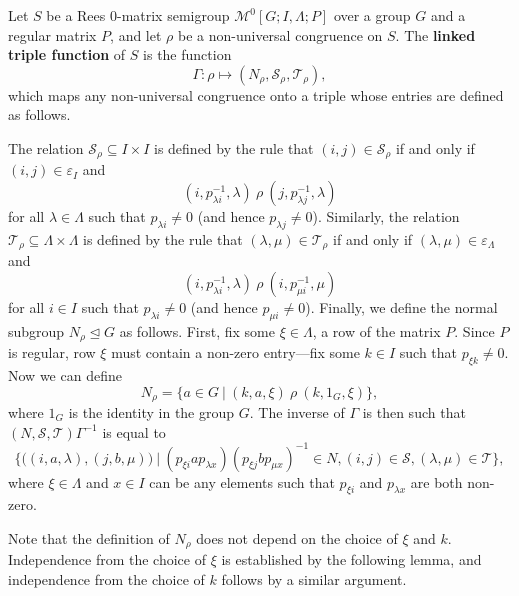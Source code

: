 \begin{definition}
  \label{def:linked-triple-function}
  Let $S$ be a Rees 0-matrix semigroup $\mathcal{M}^0[G;I,\Lambda;P]$ over a
  group $G$ and a regular matrix $P$, and let $\rho$ be a non-universal
  congruence on $S$.
  The \textbf{linked triple function} of $S$ is the function
  $$\Gamma: \rho \mapsto (N_\rho, \mathcal{S}_\rho, \mathcal{T}_\rho),$$
  which maps any non-universal congruence onto a triple whose entries are
  defined as follows.

  The relation $\mathcal{S}_\rho \subseteq I \times I$ is defined by the rule that
  $(i,j) \in \mathcal{S}_\rho$ if and only if $(i,j) \in \varepsilon_I$ and
  $$(i, p_{\lambda i}^{-1}, \lambda) ~\rho~ (j, p_{\lambda j}^{-1}, \lambda)$$
  for all $\lambda \in \Lambda$ such that $p_{\lambda i} \neq 0$ (and hence
  $p_{\lambda j} \neq 0$).  Similarly, the relation
  $\mathcal{T}_\rho \subseteq \Lambda \times \Lambda$ is defined by the rule that
  $(\lambda,\mu) \in \mathcal{T}_\rho$ if and only if
  $(\lambda,\mu) \in \varepsilon_\Lambda$ and
  $$(i, p_{\lambda i}^{-1}, \lambda) ~\rho~ (i, p_{\mu i}^{-1}, \mu)$$
  for all $i \in I$ such that $p_{\lambda i} \neq 0$ (and hence
  $p_{\mu i} \neq 0$).  Finally, we define the normal subgroup
  $N_\rho \trianglelefteq G$ as follows.  First, fix some $\xi \in \Lambda$, a
  row of the matrix $P$.  Since $P$ is regular, row $\xi$ must contain a
  non-zero entry---fix some $k \in I$ such that $p_{\xi k} \neq 0$.  Now we can
  define
  $$N_\rho = \{a \in G ~|~ (k, a, \xi) ~\rho~ (k, 1_G, \xi)\},$$
  where $1_G$ is the identity in the group $G$.
  The inverse of $\Gamma$ is then such that
  $(N, \mathcal{S}, \mathcal{T})\Gamma^{-1}$ is equal to
  $$\Big\{
  \big((i, a, \lambda), (j, b, \mu)\big) ~\Big|~
  (p_{\xi i} a p_{\lambda x}) (p_{\xi j} b p_{\mu x})^{-1} \in N,
  (i,j) \in \mathcal{S},
  (\lambda,\mu) \in \mathcal{T}
  \Big\},$$
  where $\xi \in \Lambda$ and $x \in I$ can be any elements such that
  $p_{\xi i}$ and $p_{\lambda x}$ are both non-zero.
\end{definition}

Note that the definition of $N_\rho$ does not depend on the choice of $\xi$ and
$k$.  Independence from the choice of $\xi$ is established by the following
lemma, and independence from the choice of $k$ follows by a similar argument.


